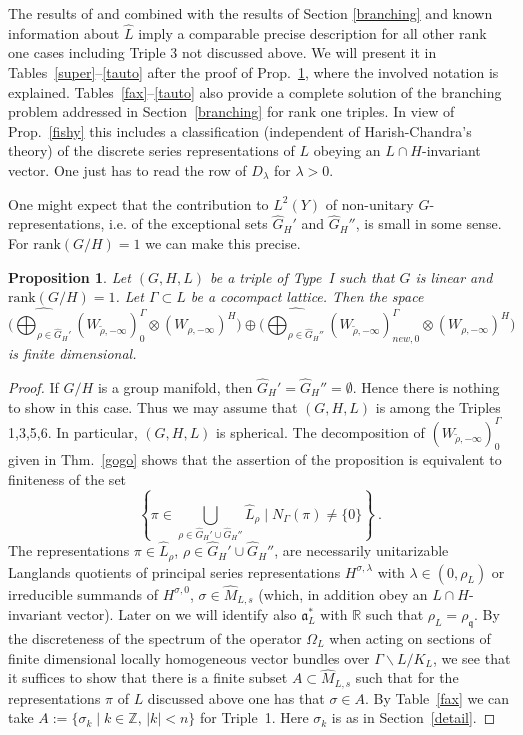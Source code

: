 \documentclass[10]{amsart}
\newtheorem{pro}[thm]{Proposition}
\theoremstyle{remark}
\theoremstyle{definition}
\numberwithin{equation}{section}
\newcommand{\R}{\mathbb{R}}           %
\newcommand{\Z}{\mathbb{Z}}         %
\newcommand{\rank}{\text{rank}}
\newcommand{\fa}{{\mathfrak a}}             %
\newcommand{\fq}{{\mathfrak q}}
\begin{document}
{The results of \cite{HoTa93} and \cite{Sch87} combined with the results of Section \ref{branching} and known information about $\widehat L$  imply a comparable precise description for all other rank one cases including Triple 3 not discussed above. We will present it in Tables~\ref{super}--\ref{tauto} after the proof of Prop.~\ref{wanndenn}, where the involved notation is explained. 
Tables~\ref{fax}--\ref{tauto} also provide a complete solution of the branching problem addressed in Section~\ref{branching} for rank one triples. In view of Prop.~\ref{fishy} this includes a classification 
(independent of Harish-Chandra's theory)
of the discrete series representations of $L$ obeying an $L\cap H$-invariant vector. One just has to read the row of  $D_\lambda$ for $\lambda>0$.

One might expect that the contribution to $L^2(Y)$ of non-unitary $G$-representations, i.e. of the exceptional sets $\widehat G_H'$ and $\widehat G_H''$, is small in some sense.
For $\rank(G/H)=1$ we can make this precise.
\begin{pro}\label{wanndenn}
Let $(G,H,L)$ be a triple of Type~I such that $G$ is linear and $\rank(G/H)=1$.  Let $\Gamma\subset L$ be a cocompact lattice.
Then the space
$$   \Big(\widehat{\bigoplus_{\rho\in\widehat G_H'}} (W_{\tilde \rho,-\infty})_0^\Gamma\otimes  (W_{\rho,-\infty})^H\Big)
\oplus\Big( \widehat{\bigoplus_{\rho\in\widehat G_H''}} (W_{\tilde \rho,-\infty})_{new,0}^\Gamma\otimes  (W_{\rho,-\infty})^H\Big)
$$  
is finite dimensional.
\end{pro}


\begin{proof} If $G/H$ is a group manifold, then $\widehat G_H'=\widehat G_H''=\emptyset$. Hence there is nothing to show in this case. Thus we may assume that $(G,H,L)$ is among
the Triples 1,3,5,6. In particular, $(G,H,L)$ is spherical. The decomposition of  $(W_{\tilde \rho,-\infty})_0^\Gamma$ given in Thm.~\ref{gogo} shows that the assertion of the proposition is equivalent to finiteness of the set
$$\left\{\pi\in\bigcup_{\rho\in \widehat G_H'\cup\widehat G_H''} \widehat L_\rho\mid N_\Gamma(\pi)\ne\{0\}\right\}\ .$$
The representations $\pi\in\widehat L_\rho$, $\rho\in \widehat G_H'\cup\widehat G_H''$, are necessarily unitarizable Langlands quotients of
principal series representations $H^{\sigma,\lambda}$ with $\lambda\in (0,\rho_L)$ or irreducible summands of $H^{\sigma,0}$, $\sigma\in\widehat M_{L,s}$ (which, in addition obey
an $L\cap H$-invariant vector).
Later on we will identify also $\fa_L^*$ with $\R$ such that $\rho_L=\rho_\fq$.
By the discreteness of the spectrum 
of the operator $\Omega_L$ when acting on sections of finite dimensional locally homogeneous vector bundles over $\Gamma\backslash L/K_L$, we see that it suffices to show that there is a finite subset $A\subset \widehat M_{L,s}$ such that for the representations $\pi$ of $L$ discussed above one has that $\sigma\in A$.
By Table~\ref{fax} we can take $A:=\{\sigma_k\mid k\in\Z,\,  |k|<n\}$ for Triple~1. Here $\sigma_k$ is as in Section~\ref{detail}.


\end{proof}}
\end{document}
